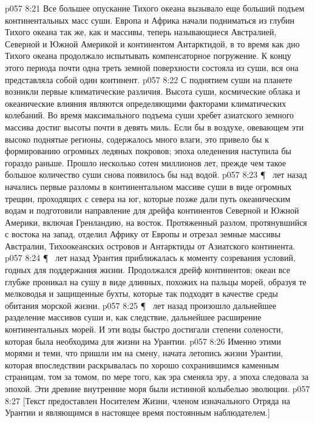 \vs p057 8:21 Все большее опускание Тихого океана вызывало еще больший подъем континентальных масс суши. Европа и Африка начали подниматься из глубин Тихого океана так же, как и массивы, теперь называющиеся Австралией, Северной и Южной Америкой и континентом Антарктидой, в то время как дно Тихого океана продолжало испытывать компенсаторное погружение. К концу этого периода почти одна треть земной поверхности состояла из суши, вся она представляла собой один континент.
\vs p057 8:22 С поднятием суши на планете возникли первые климатические различия. Высота суши, космические облака и океанические влияния являются определяющими факторами климатических колебаний. Во время максимального подъема суши хребет азиатского земного массива достиг высоты почти в девять миль. Если бы в воздухе, овевающем эти высоко поднятые регионы, содержалось много влаги, это привело бы к формированию огромных ледяных покровов; эпоха оледенения наступила бы гораздо раньше. Прошло несколько сотен миллионов лет, прежде чем такое большое количество суши снова появилось бы над водой.
\vs p057 8:23 \P\  лет назад начались первые разломы в континентальном массиве суши в виде огромных трещин, проходящих с севера на юг, которые позже дали путь океаническим водам и подготовили направление для дрейфа континентов Северной и Южной Америки, включая Гренландию, на восток. Протяженный разлом, протянувшийся с востока на запад, отделил Африку от Европы и отрезал земные массивы Австралии, Тихоокеанских островов и Антарктиды от Азиатского континента.
\vs p057 8:24 \P\  лет назад Урантия приближалась к моменту созревания условий, годных для поддержания жизни. Продолжался дрейф континентов; океан все глубже проникал на сушу в виде длинных, похожих на пальцы морей, образуя те мелководья и защищенные бухты, которые так подходят в качестве среды обитания морской жизни.
\vs p057 8:25 \P\  лет назад произошло дальнейшее разделение массивов суши и, как следствие, дальнейшее расширение континентальных морей. И эти воды быстро достигали степени солености, которая была необходима для жизни на Урантии.
\vs p057 8:26 Именно этими морями и теми, что пришли им на смену, начата летопись жизни Урантии, которая впоследствии раскрывалась по хорошо сохранившимся каменным страницам, том за томом, по мере того, как эра сменяла эру, а эпоха следовала за эпохой. Эти древние внутренние моря были истинной колыбелью эволюции.
\vs p057 8:27 [Текст предоставлен Носителем Жизни, членом изначального Отряда на Урантии и являющимся в настоящее время постоянным наблюдателем.]
